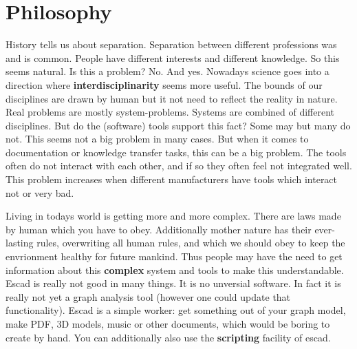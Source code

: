 \documentclass[a4paper, 12pt, openany]{scrbook}
\begin{document}
\section{Philosophy}
History tells us about separation. Separation between different professions was and is common. People have different interests and different knowledge. So this seems natural. Is this a problem? No. And yes. Nowadays science goes into a direction where \textbf{interdisciplinarity} seems more useful. The bounds of our disciplines are drawn by human but it not need to reflect the reality in nature. Real problems are mostly system-problems. Systems are combined of different disciplines. But do the (software) tools support this fact? Some may but many do not. This seems not a big problem in many cases. But when it comes to documentation or knowledge transfer tasks, this can be a big problem. The tools often do not interact with each other, and if so they often feel not integrated well. This problem increases when different manufacturers have tools which interact not or very bad.

Living in todays world is getting more and more complex. There are laws made by human which you have to obey. Additionally mother nature has their ever-lasting rules, overwriting all human rules, and which we should obey to keep the envrionment healthy for future mankind. Thus people may have the need to get information about this \textbf{complex} system and tools to make this understandable. Escad is really not good in many things. It is no unversial software. In fact it is really not yet a graph analysis tool (however one could update that functionality). Escad is a simple worker: get something out of your graph model, make PDF, 3D models, music or other documents, which would be boring to create by hand. You can additionally also use the \textbf{scripting} facility of escad.
\end{document}
